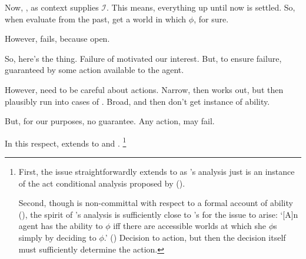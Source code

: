 \begin{note}
  Now, \BoyPS{}, as context supplies \(\mathcal{I}\).
  This means, everything up until now is settled.
  So, when evaluate from the past, get a world in which \(\phi\), for sure.

  However, \BoyVS{} fails, because open.

  So, here's the thing.
  Failure of \BoyVS{} motivated our interest.
  But, to ensure failure, guaranteed by some action available to the agent.

  However, need to be careful about actions.
  Narrow, then works out, but then plausibly run into cases of \BoyVS{}.
  Broad, and then don't get instance of ability.

  But, for our purposes, no guarantee.
  Any action, may fail.

  In this respect, extends to \textcite{Mandelkern:2017aa} and \textcite{Schwarz:2020aa}.%
  \footnote{
    First, the issue straightforwardly extends to \citeauthor{Mandelkern:2017aa} as \citeauthor{Boylan:2020aa}'s analysis just is an instance of the act conditional analysis proposed by \citeauthor{Mandelkern:2017aa} (\citeyear[cf.][\S5]{Mandelkern:2017aa}).

    Second, though \citeauthor{Schwarz:2020aa} is non-committal with respect to a formal account of ability (\citeyear[cf.][13]{Schwarz:2020aa}), the spirit of \citeauthor{Schwarz:2020aa}'s analysis is sufficiently close to \citeauthor{Boylan:2020aa}'s for the issue to arise:
    `[A]n agent has the ability to \(\phi\) iff there are accessible worlds at which she \(\phi\)s simply by deciding to \(\phi\).' (\citeyear[19]{Schwarz:2020aa})
    Decision to action, but then the decision itself must sufficiently determine the action.
  }
\end{note}

